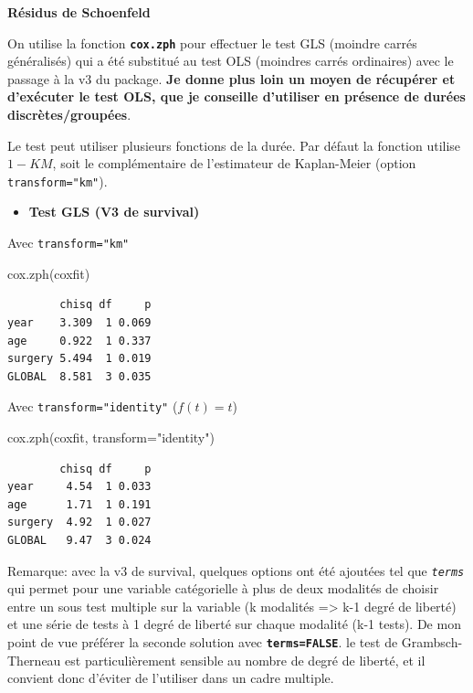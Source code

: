 \documentclass[
  12pt,
  letterpaper,
  DIV=11,
  numbers=noendperiod,
  onepage,
  openany]{scrreprt}
\newenvironment{Shaded}{\begin{snugshade}}{\end{snugshade}}
\newcommand{\AttributeTok}[1]{\textcolor[rgb]{0.80,0.80,0.80}{#1}}
\newcommand{\FunctionTok}[1]{\textcolor[rgb]{0.94,0.94,0.56}{#1}}
\newcommand{\NormalTok}[1]{\textcolor[rgb]{0.80,0.80,0.80}{#1}}
\newcommand{\StringTok}[1]{\textcolor[rgb]{0.80,0.58,0.58}{#1}}
\providecommand{\tightlist}{%
  \setlength{\itemsep}{0pt}\setlength{\parskip}{0pt}}\usepackage{longtable,booktabs,array}
\begin{document}
\textbf{Résidus de Schoenfeld}

On utilise la fonction \textbf{\texttt{cox.zph}} pour effectuer le test
GLS (moindre carrés généralisés) qui a été substitué au test OLS
(moindres carrés ordinaires) avec le passage à la v3 du package.
\textbf{Je donne plus loin un moyen de récupérer et d'exécuter le test
OLS, que je conseille d'utiliser en présence de durées
discrètes/groupées}.

Le test peut utiliser plusieurs fonctions de la durée. Par défaut la
fonction utilise \(1-KM\), soit le complémentaire de l'estimateur de
Kaplan-Meier (option \texttt{transform="km"}).

\begin{itemize}
\tightlist
\item
  \textbf{Test GLS (V3 de survival)}
\end{itemize}

Avec \texttt{transform="km"}

\begin{Shaded}
\begin{Highlighting}[]
\FunctionTok{cox.zph}\NormalTok{(coxfit)}
\end{Highlighting}
\end{Shaded}

\begin{verbatim}
        chisq df     p
year    3.309  1 0.069
age     0.922  1 0.337
surgery 5.494  1 0.019
GLOBAL  8.581  3 0.035
\end{verbatim}

Avec \texttt{transform="identity"} (\(f(t)=t\))

\begin{Shaded}
\begin{Highlighting}[]
\FunctionTok{cox.zph}\NormalTok{(coxfit, }\AttributeTok{transform=}\StringTok{"identity"}\NormalTok{)}
\end{Highlighting}
\end{Shaded}

\begin{verbatim}
        chisq df     p
year     4.54  1 0.033
age      1.71  1 0.191
surgery  4.92  1 0.027
GLOBAL   9.47  3 0.024
\end{verbatim}

Remarque: avec la v3 de survival, quelques options ont été ajoutées tel
que \emph{\texttt{terms}} qui permet pour une variable catégorielle à
plus de deux modalités de choisir entre un sous test multiple sur la
variable (k modalités =\textgreater{} k-1 degré de liberté) et une série
de tests à 1 degré de liberté sur chaque modalité (k-1 tests). De mon
point de vue préférer la seconde solution avec
\textbf{\texttt{terms=FALSE}}. le test de Grambsch-Therneau est
particulièrement sensible au nombre de degré de liberté, et il convient
donc d'éviter de l'utiliser dans un cadre multiple.
\end{document}
